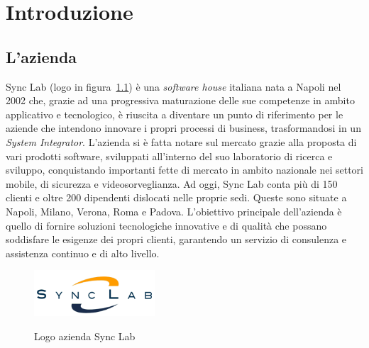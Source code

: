 \chapter{Introduzione}\label{cap:introduzione}


\section{L'azienda}\label{sec:azienda}

Sync Lab (logo in figura~\ref{fig:logo-synclab}) è una \textit{software house} italiana 
nata a Napoli nel 2002 che, grazie ad una progressiva
maturazione delle sue competenze in ambito applicativo e tecnologico, è riuscita a diventare un
punto di riferimento per le aziende che intendono innovare i propri processi di business,
trasformandosi in un \textit{System Integrator}. L'azienda si è fatta notare sul mercato grazie alla proposta
di vari prodotti software, sviluppati all'interno del suo laboratorio di ricerca e sviluppo, 
conquistando importanti fette di mercato in ambito nazionale nei settori mobile, di sicurezza e videosorveglianza.
Ad oggi, Sync Lab conta più di 150 clienti e oltre 200 dipendenti dislocati nelle proprie sedi.
Queste sono situate a Napoli, Milano, Verona, Roma e Padova.
L'obiettivo principale dell'azienda è quello di fornire soluzioni tecnologiche innovative e di qualità
che possano soddisfare le esigenze dei propri clienti, garantendo un servizio di consulenza
e assistenza continuo e di alto livello.\\

\begin{figure}[h]
    \centering
    \includegraphics[width=0.4\textwidth, alt={Logo dell'azienda Sync Lab}]{immagini/synclab.png}
    \caption{Logo azienda Sync Lab}\label{fig:logo-synclab}
\end{figure}

\newpage

